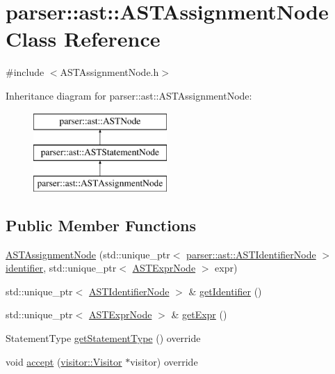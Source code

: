 \hypertarget{classparser_1_1ast_1_1ASTAssignmentNode}{}\section{parser\+:\+:ast\+:\+:A\+S\+T\+Assignment\+Node Class Reference}
\label{classparser_1_1ast_1_1ASTAssignmentNode}


{\ttfamily \#include $<$A\+S\+T\+Assignment\+Node.\+h$>$}

Inheritance diagram for parser\+:\+:ast\+:\+:A\+S\+T\+Assignment\+Node\+:\begin{figure}[H]
\begin{center}
\leavevmode
\includegraphics[height=3.000000cm]{d9/de4/classparser_1_1ast_1_1ASTAssignmentNode}
\end{center}
\end{figure}
\subsection*{Public Member Functions}
\begin{DoxyCompactItemize}
\item 
\hyperlink{classparser_1_1ast_1_1ASTAssignmentNode_aa187a542a462035acd30b07555e2c9f8}{A\+S\+T\+Assignment\+Node} (std\+::unique\+\_\+ptr$<$ \hyperlink{classparser_1_1ast_1_1ASTIdentifierNode}{parser\+::ast\+::\+A\+S\+T\+Identifier\+Node} $>$ \hyperlink{classparser_1_1ast_1_1ASTAssignmentNode_adc2b80713ab5ad6a0fa5f173473e505d}{identifier}, std\+::unique\+\_\+ptr$<$ \hyperlink{classparser_1_1ast_1_1ASTExprNode}{A\+S\+T\+Expr\+Node} $>$ expr)
\item 
std\+::unique\+\_\+ptr$<$ \hyperlink{classparser_1_1ast_1_1ASTIdentifierNode}{A\+S\+T\+Identifier\+Node} $>$ \& \hyperlink{classparser_1_1ast_1_1ASTAssignmentNode_aaff40f77ab7db5be4b4c4f354f2e8d7a}{get\+Identifier} ()
\item 
std\+::unique\+\_\+ptr$<$ \hyperlink{classparser_1_1ast_1_1ASTExprNode}{A\+S\+T\+Expr\+Node} $>$ \& \hyperlink{classparser_1_1ast_1_1ASTAssignmentNode_a0610348cf9d4f3302320ebd6598e45e2}{get\+Expr} ()
\item 
Statement\+Type \hyperlink{classparser_1_1ast_1_1ASTAssignmentNode_ad53e33c7aa72d26b67e38699bdac2e32}{get\+Statement\+Type} () override
\item 
void \hyperlink{classparser_1_1ast_1_1ASTAssignmentNode_abfbf5dd90191738f1faea1334fe8480b}{accept} (\hyperlink{classvisitor_1_1Visitor}{visitor\+::\+Visitor} $\ast$visitor) override
\end{DoxyCompactItemize}
